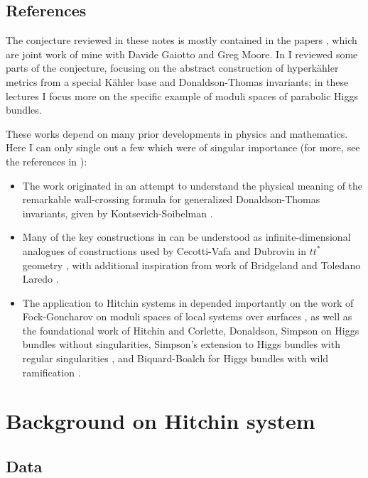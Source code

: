 \documentclass[12pt,letterpaper,reqno]{article}
\newcounter{papers}\setcounter{papers}{0}
\numberwithin{equation}{section}
\newcommand{\kahler}{K\"ahler\xspace}
\newcommand{\hk}{hyperk\"ahler\xspace}
\begin{document}
\subsection{References}

The conjecture reviewed in these notes is mostly contained in 
the papers \cite{Gaiotto:2008cd,Gaiotto:2009hg},
which are joint work of mine with Davide Gaiotto and Greg
Moore.
In \cite{notes-hk} I reviewed some parts of the conjecture,
focusing on the abstract construction of \hk metrics from a
special \kahler base and Donaldson-Thomas invariants;
in these lectures I focus more on the specific example
of moduli spaces of parabolic Higgs bundles.

These works depend on many prior developments
in physics and mathematics. Here I can only single out a few
which were of singular importance (for more, see the references
in \cite{Gaiotto:2008cd,Gaiotto:2009hg}):
\begin{itemize}
\item The work \cite{Gaiotto:2008cd} 
originated in an attempt to understand the physical
meaning of the remarkable wall-crossing formula for generalized
Donaldson-Thomas invariants, given by Kontsevich-Soibelman \cite{ks1}.
\item Many of the key constructions in 
\cite{Gaiotto:2008cd} can
be understood as infinite-dimensional analogues 
of constructions used by Cecotti-Vafa and Dubrovin in 
$tt^*$ geometry \cite{Cecotti:1993rm,MR1213301}, with
additional inspiration from work of Bridgeland and 
Toledano Laredo \cite{stab-stokes}.
\item The application to Hitchin systems
in \cite{Gaiotto:2009hg} depended importantly on
the work of Fock-Goncharov on moduli spaces
of local systems over surfaces \cite{MR2233852},
as well as the foundational work
of Hitchin \cite{MR89a:32021} and Corlette, Donaldson, Simpson
\cite{MR965220,MR887285,MR944577} on Higgs bundles without
singularities, Simpson's extension to 
Higgs bundles with regular 
singularities \cite{hbnc}, and Biquard-Boalch for Higgs
bundles with wild ramification \cite{wnh}.
\end{itemize}

\section{Background on Hitchin system}

\subsection{Data}
\end{document}

